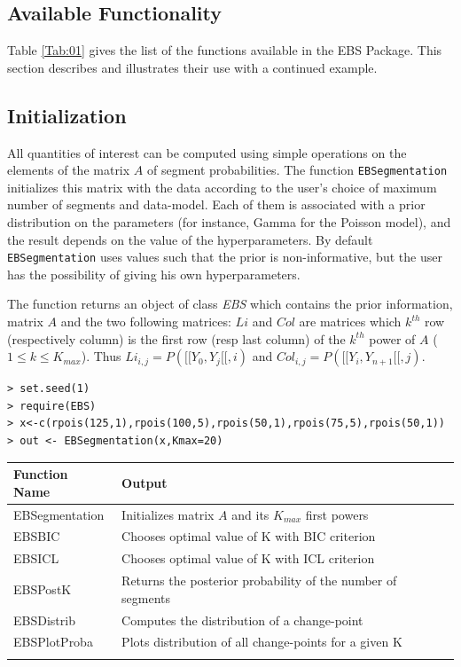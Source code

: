 \documentclass{bioinfo}
\begin{document}
\begin{methods}

\section{Available Functionality}

Table \ref{Tab:01} gives the list of the functions available in the EBS Package. This section describes and illustrates their use with a continued example. 

\subsection{Initialization}

All quantities of interest can be computed using simple operations on the elements of the matrix $A$ of segment probabilities. The function \texttt{EBSegmentation} initializes this matrix with the data according to the user's choice of maximum number of segments and data-model. Each of them is associated with a prior distribution on the parameters (for instance, Gamma for the Poisson model), and the result depends on the value of the hyperparameters. By default \texttt{EBSegmentation} uses values such that the prior is non-informative, but the user has the possibility of giving his own hyperparameters.

The function returns an object of class \textit{EBS} which contains the prior information, matrix $A$ and the two following matrices: $Li$ and $Col$ are matrices which $k^{th}$ row (respectively column) is the first row (resp last column) of the $k^{th}$ power of $A$ ($1\leq k \leq K_{max}$). Thus $Li_{i,j}=P([\![Y_0,Y_j[\![,i)$ and $Col_{i,j}=P([\![Y_i,Y_{n+1}[\![,j)$.

\begin{verbatim}
> set.seed(1)
> require(EBS)
> x<-c(rpois(125,1),rpois(100,5),rpois(50,1),rpois(75,5),rpois(50,1))
> out <- EBSegmentation(x,Kmax=20)
\end{verbatim}


\begin{table}[!t]
{\begin{tabular}{ll}\toprule
Function Name & Output \\\midrule
 EBSegmentation & Initializes matrix $A$ and its $K_{max}$ first powers\\
 EBSBIC & Chooses optimal value of K with BIC criterion\\
 EBSICL & Chooses optimal value of K with ICL criterion\\ 
 EBSPostK & Returns the posterior probability of the number of segments\\
 EBSDistrib & Computes the distribution of a change-point\\
 EBSPlotProba & Plots distribution of all change-points for a given K\\\botrule
\end{tabular}}{}
\end{table}





\end{methods}
\end{document}

